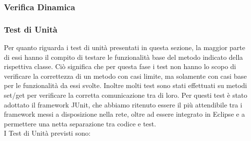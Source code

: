 \subsubsection{Verifica Dinamica}

\subsubsection*{Test di Unit\`a}

Per quanto riguarda i test di unit\`a presentati in questa sezione, la maggior
parte di essi hanno il compito di testare le funzionalit\`a base del metodo
indicato della rispettiva classe. Ci\`o significa che per questa fase i test non
hanno lo scopo di verificare la correttezza di un metodo con casi limite, ma
solamente con casi base per le funzionalit\`a da essi svolte. Inoltre molti test
sono stati effettuati su metodi set/get per verificare la corretta comunicazione
tra di loro. Per questi test \`e stato adottato il framework JUnit, che abbiamo
ritenuto essere il pi\`u attendibile tra i framework messi a disposizione nella
rete, oltre ad essere integrato in Eclipse e a permettere una netta separazione
tra codice e test.\\

I Test di Unit\`a previsti sono:

